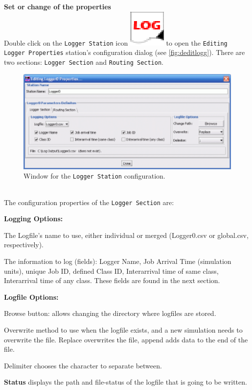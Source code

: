 \begin{enumerate*}
\noindent \textbf{Set or change of the properties}\\
Double click on the \texttt{Logger Station} icon
\includegraphics[scale=.5]{img/jsimg/logger}
to open the \texttt{Editing Logger Properties} station's
configuration dialog (see \autoref{fig:deditlogg}). There are two
sections:
\texttt{Logger Section} and \texttt{Routing Section}.\\
\begin{figure}[htb]
    \begin{center}
        \includegraphics[scale=.8]{img/jsimg/logger_editFull_sm.eps}
    \end{center}
    \caption{Window for the \texttt{Logger Station} configuration.}
    \label{fig:deditlogg}
\end{figure}

\\
The configuration properties of the \texttt{Logger Section} are:
\begin{itemize*} \item \textbf{Logging Options:}
\begin{itemize*} \item   The Logfile's name to use, either individual or merged
(Logger0.csv or global.csv, respectively). \item The information
to log (fields): Logger Name, Job Arrival Time (simulation units),
unique Job ID, defined Class ID, Interarrival time of same class,
Interarrival time of any class. These fields are found in the next
section. \end{itemize*} \item \textbf{Logfile Options:}
\begin{itemize*} \item Browse button: allows changing the directory where
logfiles are stored. \item Overwrite method to use when the
logfile exists, and a new simulation needs to overwrite the file.
Replace overwrites the file, append adds data to the end of the
file. \item Delimiter chooses the character to separate between.
\end{itemize*}
\item \textbf{Status} displays the path and file-status of the
logfile that is going to be written.
\end{itemize*}


\end{enumerate*}

